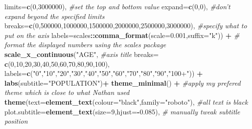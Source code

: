 \documentclass[]{article}
\newenvironment{Shaded}{\begin{snugshade}}{\end{snugshade}}
\newcommand{\KeywordTok}[1]{\textcolor[rgb]{0.13,0.29,0.53}{\textbf{#1}}}
\newcommand{\DataTypeTok}[1]{\textcolor[rgb]{0.13,0.29,0.53}{#1}}
\newcommand{\DecValTok}[1]{\textcolor[rgb]{0.00,0.00,0.81}{#1}}
\newcommand{\FloatTok}[1]{\textcolor[rgb]{0.00,0.00,0.81}{#1}}
\newcommand{\StringTok}[1]{\textcolor[rgb]{0.31,0.60,0.02}{#1}}
\newcommand{\CommentTok}[1]{\textcolor[rgb]{0.56,0.35,0.01}{\textit{#1}}}
\newcommand{\OperatorTok}[1]{\textcolor[rgb]{0.81,0.36,0.00}{\textbf{#1}}}
\newcommand{\NormalTok}[1]{#1}
\begin{document}
\begin{Shaded}
\begin{Highlighting}[]
{                     \DataTypeTok{limits=}\KeywordTok{c}\NormalTok{(}\DecValTok{0}\NormalTok{,}\DecValTok{3000000}\NormalTok{), }\CommentTok{#set the top and bottom value}
                     \DataTypeTok{expand=}\KeywordTok{c}\NormalTok{(}\DecValTok{0}\NormalTok{,}\DecValTok{0}\NormalTok{), }\CommentTok{#don't expand beyond the specified limits}
                     \DataTypeTok{breaks=}\KeywordTok{c}\NormalTok{(}\DecValTok{0}\NormalTok{,}\DecValTok{500000}\NormalTok{,}\DecValTok{1000000}\NormalTok{,}\DecValTok{1500000}\NormalTok{,}\DecValTok{2000000}\NormalTok{,}\DecValTok{2500000}\NormalTok{,}\DecValTok{3000000}\NormalTok{), }\CommentTok{#specify what to put on the axis}
                     \DataTypeTok{labels=}\NormalTok{scales}\OperatorTok{::}\KeywordTok{comma_format}\NormalTok{(}\DataTypeTok{scale=}\FloatTok{0.001}\NormalTok{,}\DataTypeTok{suffix=}\StringTok{"k"}\NormalTok{)) }\OperatorTok{+}\StringTok{ }\CommentTok{# format the displayed numbers using the scales package}
\StringTok{  }\KeywordTok{scale_x_continuous}\NormalTok{(}\StringTok{"AGE"}\NormalTok{, }\CommentTok{#axis title}
                     \DataTypeTok{breaks=} \KeywordTok{c}\NormalTok{(}\DecValTok{0}\NormalTok{,}\DecValTok{10}\NormalTok{,}\DecValTok{20}\NormalTok{,}\DecValTok{30}\NormalTok{,}\DecValTok{40}\NormalTok{,}\DecValTok{50}\NormalTok{,}\DecValTok{60}\NormalTok{,}\DecValTok{70}\NormalTok{,}\DecValTok{80}\NormalTok{,}\DecValTok{90}\NormalTok{,}\DecValTok{100}\NormalTok{),}
                     \DataTypeTok{labels=}\KeywordTok{c}\NormalTok{(}\StringTok{"0"}\NormalTok{,}\StringTok{"10"}\NormalTok{,}\StringTok{"20"}\NormalTok{,}\StringTok{"30"}\NormalTok{,}\StringTok{"40"}\NormalTok{,}\StringTok{"50"}\NormalTok{,}\StringTok{"60"}\NormalTok{,}\StringTok{"70"}\NormalTok{,}\StringTok{"80"}\NormalTok{,}\StringTok{"90"}\NormalTok{,}\StringTok{"100+"}\NormalTok{)) }\OperatorTok{+}
\StringTok{  }\KeywordTok{labs}\NormalTok{(}\DataTypeTok{subtitle=}\StringTok{"POPULATION"}\NormalTok{)}\OperatorTok{+}
\StringTok{  }\KeywordTok{theme_minimal}\NormalTok{() }\OperatorTok{+}\StringTok{ }\CommentTok{#apply my prefered theme which is close to what Nathan used}
\StringTok{  }\KeywordTok{theme}\NormalTok{(}\DataTypeTok{text=}\KeywordTok{element_text}\NormalTok{(}\DataTypeTok{colour=}\StringTok{"black"}\NormalTok{,}\DataTypeTok{family=}\StringTok{"roboto"}\NormalTok{), }\CommentTok{#all text is black}
        \DataTypeTok{plot.subtitle=}\KeywordTok{element_text}\NormalTok{(}\DataTypeTok{size=}\DecValTok{9}\NormalTok{,}\DataTypeTok{hjust=}\OperatorTok{-}\FloatTok{0.085}\NormalTok{), }\CommentTok{# manually tweak subtitle position}
}
\end{Highlighting}
\end{Shaded}
\end{document}
